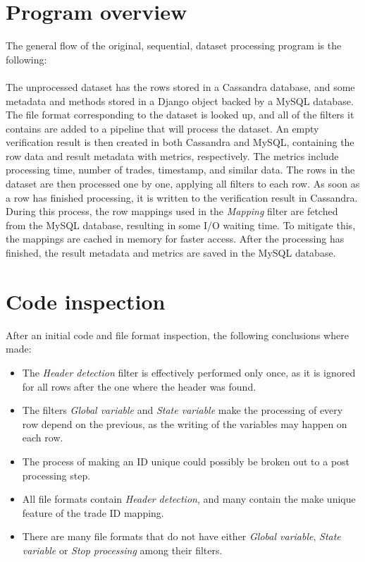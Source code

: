 \section{Program overview} %
The general flow of the original, sequential, dataset processing program is the following:
\\\\
The unprocessed dataset has the rows stored in a Cassandra database, and some metadata and methods stored in a Django object backed by a MySQL database.
The file format corresponding to the dataset is looked up, and all of the filters it contains are added to a pipeline that will process the dataset.
An empty verification result is then created in both Cassandra and MySQL, containing the row data and result metadata with metrics, respectively.
The metrics include processing time, number of trades, timestamp, and similar data. The rows in the dataset are then processed one by one,
applying all filters to each row. As soon as a row has finished processing, it is written to the verification result in Cassandra.
During this process, the row mappings used in the \textit{Mapping} filter are fetched from the MySQL database, resulting in some
I/O waiting time. To mitigate this, the mappings are cached in memory for faster access. After the processing has finished, the result metadata
and metrics are saved in the MySQL database.

\section{Code inspection}
After an initial code and file format inspection, the following conclusions where made:
\begin{itemize}
  \item The \textit{Header detection} filter is effectively performed only once, as it is ignored for all rows after the one where the header was found.
  \item The filters \textit{Global variable} and \textit{State variable} make the processing of every row depend on the previous, as the writing of the variables may happen on each row.
  \item The process of making an ID unique could possibly be broken out to a post processing step.
  \item All file formats contain \textit{Header detection}, and many contain the make unique feature of the trade ID mapping.
  \item There are many file formats that do not have either \textit{Global variable}, \textit{State variable} or \textit{Stop processing} among their filters.
\end{itemize}

